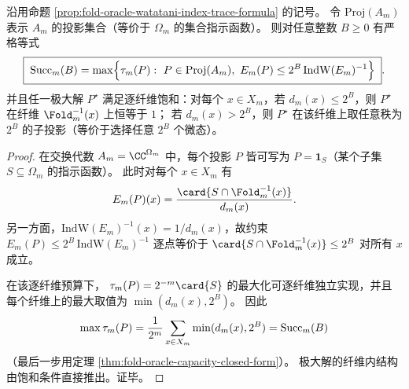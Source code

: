 \begin{proposition}[预算约束下的变分刻画]\label{prop:fold-oracle-variational-projection-characterization}
沿用命题 \ref{prop:fold-oracle-watatani-index-trace-formula} 的记号。
令 \(\mathrm{Proj}(A_m)\) 表示 \(A_m\) 的投影集合（等价于 \(\Omega_m\) 的集合指示函数）。
则对任意整数 \(B\ge 0\) 有严格等式
\[
\boxed{\;
{\rm Succ}_m(B)
=\max\Bigl\{\tau_m(P):\ P\in\mathrm{Proj}(A_m),\ E_m(P)\le 2^B\,\mathrm{IndW}(E_m)^{-1}\Bigr\}\; }.
\]
并且任一极大解 \(P^\star\) 满足逐纤维饱和：对每个 \(x\in X_m\)，若 \(d_m(x)\le 2^B\)，则 \(P^\star\) 在纤维 \(\Fold_m^{-1}(x)\) 上恒等于 \(1\)；
若 \(d_m(x)>2^B\)，则 \(P^\star\) 在该纤维上取任意秩为 \(2^B\) 的子投影（等价于选择任意 \(2^B\) 个微态）。
\end{proposition}
\begin{proof}
在交换代数 \(A_m=\CC^{\Omega_m}\) 中，每个投影 \(P\) 皆可写为 \(P=\mathbf 1_S\)（某个子集 \(S\subseteq\Omega_m\) 的指示函数）。
此时对每个 \(x\in X_m\) 有
\[
E_m(P)(x)=\frac{\card{S\cap \Fold_m^{-1}(x)}}{d_m(x)}.
\]
另一方面，\(\mathrm{IndW}(E_m)^{-1}(x)=1/d_m(x)\)，故约束
\(
E_m(P)\le 2^B\,\mathrm{IndW}(E_m)^{-1}
\)
逐点等价于
\(
\card{S\cap \Fold_m^{-1}(x)}\le 2^B
\)
对所有 \(x\) 成立。
\par
在该逐纤维预算下，
\(
\tau_m(P)=2^{-m}\card{S}
\)
的最大化可逐纤维独立实现，并且每个纤维上的最大取值为 \(\min(d_m(x),2^B)\)。
因此
\[
\max \tau_m(P)
=\frac{1}{2^m}\sum_{x\in X_m}\min(d_m(x),2^B)
={\rm Succ}_m(B)
\]
（最后一步用定理 \ref{thm:fold-oracle-capacity-closed-form}）。
极大解的纤维内结构由饱和条件直接推出。证毕。
\end{proof}

